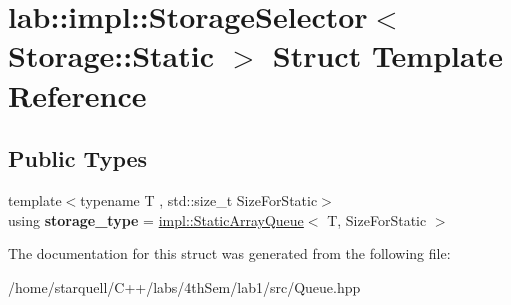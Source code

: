 \hypertarget{structlab_1_1impl_1_1StorageSelector_3_01Storage_1_1Static_01_4}{}\section{lab\+:\+:impl\+:\+:Storage\+Selector$<$ Storage\+:\+:Static $>$ Struct Template Reference}
\label{structlab_1_1impl_1_1StorageSelector_3_01Storage_1_1Static_01_4}
\subsection*{Public Types}
\begin{DoxyCompactItemize}
\item 
\mbox{\label{structlab_1_1impl_1_1StorageSelector_3_01Storage_1_1Static_01_4_a16cc53047e6db12365451ff2de980037}} 
{\footnotesize template$<$typename T , std\+::size\+\_\+t Size\+For\+Static$>$ }\\using {\bfseries storage\+\_\+type} = \hyperlink{classlab_1_1impl_1_1StaticArrayQueue}{impl\+::\+Static\+Array\+Queue}$<$ T, Size\+For\+Static $>$
\end{DoxyCompactItemize}


The documentation for this struct was generated from the following file\+:\begin{DoxyCompactItemize}
\item 
/home/starquell/\+C++/labs/4th\+Sem/lab1/src/Queue.\+hpp\end{DoxyCompactItemize}

